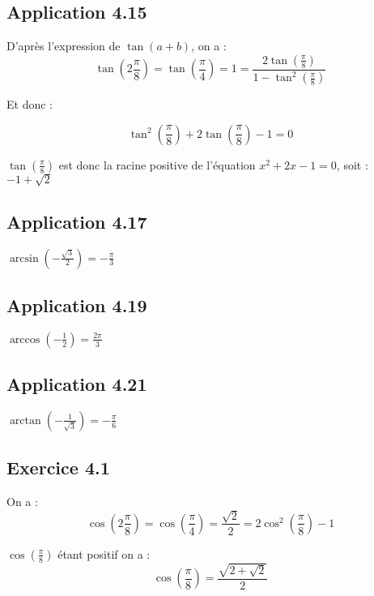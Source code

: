 \documentclass[a4paper,10pt]{report}
\begin{document}
\subsection*{Application 4.15}

D'après l'expression de $\tan(a+b)$, on a :
\begin{displaymath}
	\tan\left( 2\frac{\pi}{8} \right) = \tan\left( \frac{\pi}{4} \right)= 1 =\frac{2\tan\left( \frac{\pi}{8} \right)}{1-\tan^2\left( \frac{\pi}{8} \right)}
\end{displaymath}

Et donc :

\begin{displaymath}
	\tan^2\left( \frac{\pi}{8} \right) + 2\tan\left( \frac{\pi}{8} \right) -1 = 0
\end{displaymath}

$\tan\left( \frac{\pi}{8} \right)$ est donc la racine positive de l'équation $x^2+ 2x -1 = 0$, soit : $-1 + \sqrt{2}$

\subsection*{Application 4.17}

$\arcsin\left( -\frac{\sqrt{3}}{2}\right) = -\frac{\pi}{3} $

\subsection*{Application 4.19}

$\arccos\left( -\frac{1}{2}\right) = \frac{2\pi}{3} $

\subsection*{Application 4.21}

$\arctan\left( -\frac{1}{\sqrt{3}}\right) = -\frac{\pi}{6} $

\subsection*{Exercice 4.1}

On a :
\begin{displaymath}
	\cos\left( 2\frac{\pi}{8} \right) = \cos\left( \frac{\pi}{4} \right) = \frac{\sqrt{2}}{2} = 2\cos^2\left(\frac{\pi}{8}\right) -1
\end{displaymath}

$\cos\left(\frac{\pi}{8}\right)$ étant positif on a :
\begin{displaymath}
	\cos\left(\frac{\pi}{8}\right) = \frac{\sqrt{2+\sqrt{2}}}{2}
\end{displaymath}
\end{document}
